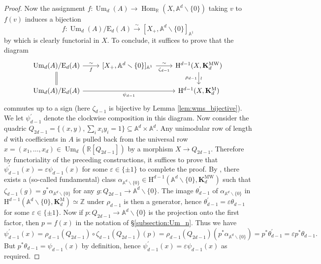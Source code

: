 \documentclass[11pt,leqno]{amsart}
\newcommand{\Hom}{\operatorname{Hom}}
\renewcommand{\1}{{\rm 1\hspace*{-0.4ex}%
\rule{0.1ex}{1.52ex}\hspace*{0.2ex}}}
\newcommand{\Hr}{{\mathrm {H}}}
\newcommand{\<}[1]{{\langle}#1 {\rangle}}
\newcommand{\Rb}{\mathbb{R}}
\newcommand{\Zb}{\mathbb{Z}}
\newcommand{\Kbf}{\mathbf{K}}
\newcommand{\Er}{\mathrm{E}}
\newcommand{\Abb}{\mathbb{A}}
\newcommand{\Mr}{\mathrm{M}}
\newcommand{\Um}{\operatorname{Um}}
\newcommand{\MW}{\mathrm{MW}}
\theoremstyle{plain}
\theoremstyle{definition}
\theoremstyle{remark}
\numberwithin{equation}{section}
\begin{document}
\begin{proof}
Now the assignment $f:\Um_d(A)\to\Hom_\Rb(X,\Abb^d\smallsetminus\{0\})$ taking $v$ to $f(v)$ induces a bijection \[f:\Um_d(A)/\Er_d(A)\xrightarrow{\sim}[X_+,\Abb^d\smallsetminus\{0\}]_{\Abb^1}\] by \cite[Remark 8.10]{morelA1AlgebraicTopologyField2012} which is clearly functorial in $X$. To conclude, it suffices to prove that the diagram
\[\begin{tikzcd}
	{\Um_d(A)/\Er_d(A)} & {[X_+,\Abb^d\smallsetminus\{0\}]_{\Abb^1}} & {\Hr^{d-1}(X,\Kbf_d^\MW)} \\
	{\Um_d(A)/\Er_d(A)} && {\Hr^{d-1}(X,\Kbf_d^\Mr)}
	\arrow["{f}"', "\sim", from=1-1, to=1-2]
	\arrow[equal, from=1-1, to=2-1]
	\arrow["{\zeta_{d-1}}"', "\sim", from=1-2, to=1-3]
	\arrow["\wr", "\rho_{d-1}"', from=1-3, to=2-3]
	\arrow["{\psi_{d-1}}"', from=2-1, to=2-3]
\end{tikzcd}\]
commutes up to a sign (here $\zeta_{d-1}$ is bijective by Lemma \ref{lem:wms_bijective}). We let $\psi_{d-1}^\prime$ denote the clockwise composition in this diagram. Now consider the quadric $Q_{2d-1}=\{(x,y),\sum_ix_iy_i=1\}\subseteq\Abb^{d}\times\Abb^{d}$. Any unimodular row of length $d$ with coefficients in $A$ is pulled back from the universal row $x=(x_1,\ldots,x_d)\in\Um_d(\Rb[Q_{2d-1}])$ by a morphism $X\to Q_{2d-1}$. Therefore by functoriality of the preceding constructions, it suffices to prove that $\psi_{d-1}^\prime(x)=\varepsilon\psi_{d-1}(x)$ for some $\varepsilon\in\{\pm 1\}$ to complete the proof. By \cite[Theorem 1.3.4]{asokEulerClassGroups2021}, there exists a (so-called fundamental) class $\alpha_{\Abb^d\smallsetminus\{0\}}\in\Hr^{d-1}(\Abb^d\smallsetminus\{0\},\Kbf_d^\MW)$ such that $\zeta_{d-1}(g)=g^*\alpha_{\Abb^d\smallsetminus\{0\}}$ for any $g:Q_{2d-1}\to\Abb^d\smallsetminus\{0\}$. The image $\theta_{d-1}^\prime$ of $\alpha_{\Abb^d\smallsetminus\{0\}}$ in $\Hr^{d-1}(\Abb^d\smallsetminus\{0\},\Kbf_d^\Mr)\simeq\Zb$ under $\rho_{d-1}$ is then a generator, hence $\theta_{d-1}^\prime=\varepsilon\theta_{d-1}$ for some $\varepsilon\in\{\pm 1\}$. Now if $p:Q_{2d-1}\to\Abb^d\smallsetminus\{0\}$ is the projection onto the first factor, then $p=f(x)$ in the notation of §\ref{subsection:Um_n}. Thus we have \[\psi_{d-1}^\prime(x)=\rho_{d-1}(Q_{2d-1})\circ\zeta_{d-1}(Q_{2d-1})(p)=\rho_{d-1}(Q_{2d-1})(p^*\alpha_{\Abb^d\smallsetminus\{0\}})=p^*\theta_{d-1}^\prime=\varepsilon p^*\theta_{d-1}.\] But $p^*\theta_{d-1}=\psi_{d-1}(x)$ by definition, hence $\psi_{d-1}^\prime(x)=\varepsilon\psi_{d-1}(x)$ as required.
\end{proof}
\end{document}
